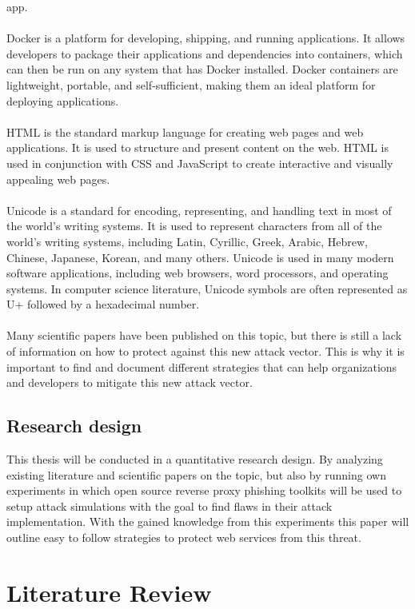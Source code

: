 \documentclass[12pt]{report}
\begin{document}
app. \\ \\
Docker is a platform for developing, shipping, and running applications. It allows
developers to package their applications and dependencies into containers, which
can then be run on any system that has Docker installed. Docker containers are
lightweight, portable, and self-sufficient, making them an ideal platform for
deploying applications. \\ \\
HTML is the standard markup language for creating web pages and web applications.
It is used to structure and present content on the web. HTML is used in conjunction
with CSS and JavaScript to create interactive and visually appealing web pages.
\\ \\
Unicode is a standard for encoding, representing, and handling text in most of the
world's writing systems. It is used to represent characters from all of the world's
writing systems, including Latin, Cyrillic, Greek, Arabic, Hebrew, Chinese, Japanese,
Korean, and many others. Unicode is used in many modern software applications,
including web browsers, word processors, and operating systems. In computer science
literature, Unicode symbols are often represented as U+ followed by a hexadecimal number. \\ \\
Many scientific papers have been published on this topic, but there is still a
lack of information on how to protect against this new attack vector. This is why
it is important to find and document different strategies that can help organizations
and developers to mitigate this new attack vector.

\section{Research design}
This thesis will be conducted in a quantitative research design. By analyzing
existing literature and scientific papers on the topic, but also by running own
experiments in which open source reverse proxy phishing toolkits will be used to
setup attack simulations with the goal to find flaws in their attack implementation.
With the gained knowledge from this experiments this paper will outline easy
to follow strategies to protect web services from this threat.

\newpage
\chapter{Literature Review}
\end{document}
